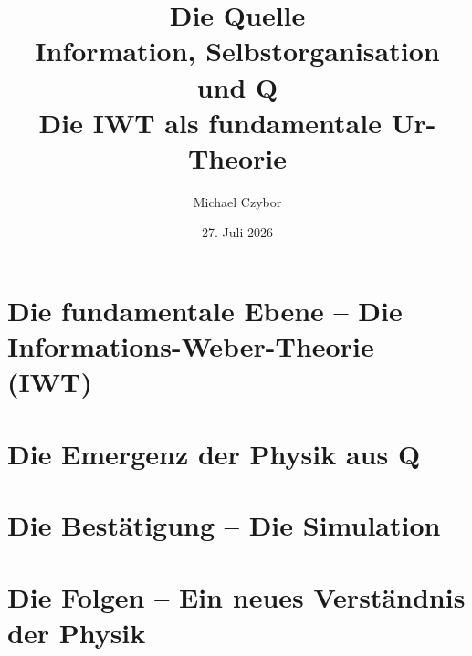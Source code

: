 \documentclass[11pt,a4paper]{book}
\title{Die Quelle \\
\large Information, Selbstorganisation und Q \\
\small Die IWT als fundamentale Ur-Theorie}
\author{Michael Czybor}
\date{27. Juli 2026}
\begin{document}
\maketitle
\tableofcontents



\part{Die fundamentale Ebene – Die Informations-Weber-Theorie (IWT)}





\part{Die Emergenz der Physik aus Q}






\part{Die Bestätigung – Die Simulation}




\part{Die Folgen – Ein neues Verständnis der Physik}





\appendix




\end{document}
